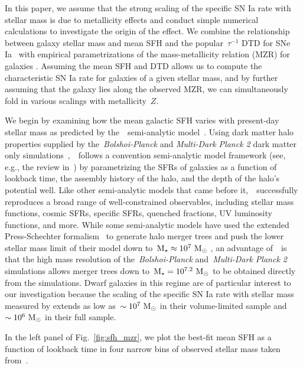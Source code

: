 \documentclass[ms.tex]{subfiles}
\begin{document}
In this paper, we assume that the strong scaling of the specific SN Ia rate
with stellar mass is due to metallicity effects and conduct simple numerical
calculations to investigate the origin of the effect.
We combine the relationship between galaxy stellar mass and mean SFH and the
popular~$\tau^{-1}$ DTD for SNe Ia~\citep[e.g.][]{Maoz2012a} with empirical
parametrizations of the mass-metallicity relation (MZR) for galaxies
\citep{Tremonti2004, Andrews2013, Zahid2011, Zahid2014}.
Assuming the mean SFH and DTD allows us to compute the characteristic SN Ia
rate for galaxies of a given stellar mass, and by further assuming that the
galaxy lies along the observed MZR, we can simultaneously fold in various
scalings with metallicity~$Z$.
\par
We begin by examining how the mean galactic SFH varies with present-day stellar
mass as predicted by the~\um~semi-analytic model~\citep{Behroozi2019}.
Using dark matter halo properties supplied by the~\textit{Bolshoi-Planck} and
\textit{Multi-Dark Planck 2} dark matter only simulations~\citep{Klypin2016,
Rodriguez-Puebla2016},~\um~follows a convention semi-analytic model framework
(see, e.g., the review in~\citealt{Somerville2015a}) by parametrizing the SFRs
of galaxies as a function of lookback time, the assembly history of the halo,
and the depth of the halo's potential well.
Like other semi-analytic models that came before it,~\um~successfully
reproduces a broad range of well-constrained observables, including stellar
mass functions, cosmic SFRs, specific SFRs, quenched fractions, UV luminosity
functions, and more.
While some semi-analytic models have used the extended Press-Schechter
formalism~\citep{Press1974, Bond1991} to generate halo merger trees and push
the lower stellar mass limit of their model down to~$\text{M}_\star \approx 10^7~\text{M}_\odot$
\citep[e.g.][]{Somerville2015b}, an advantage of~\um~is that the high mass
resolution of the~\textit{Bolshoi-Planck} and~\textit{Multi-Dark Planck 2}
simulations allows merger trees down to~$\text{M}_\star = 10^{7.2}~\text{M}_\odot$ to be
obtained directly from the simulations.
Dwarf galaxies in this regime are of particular interest to our investigation
because the scaling of the specific SN Ia rate with stellar mass measured by
\citet{Brown2019} extends as low as~$\sim 10^7~\text{M}_\odot$ in their volume-limited
sample and~$\sim 10^6~\text{M}_\odot$ in their full sample.
\par
In the left panel of Fig.~\ref{fig:sfh_mzr}, we plot the best-fit mean SFH as a
function of lookback time in four narrow bins of observed stellar mass taken
from~\um.
\end{document}
